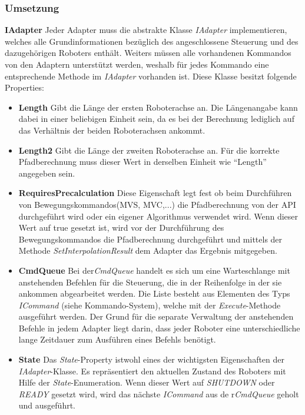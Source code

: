 \subsubsection{Umsetzung}
\textbf{IAdapter}
\newline
Jeder Adapter muss die abstrakte Klasse \textit{IAdapter} implementieren, welches alle Grundinformationen bezüglich des angeschlossene Steuerung und des dazugehörigen Roboters enthält. Weiters müssen alle vorhandenen Kommandos von den Adaptern unterstützt werden, weshalb für jedes Kommando eine entsprechende Methode im \textit{IAdapter} vorhanden ist. Diese Klasse besitzt folgende Properties:
\begin{itemize}
\item \textbf{Length}
\newline
Gibt die Länge der ersten Roboterachse an. Die Längenangabe kann dabei in einer beliebigen Einheit sein, da es bei der Berechnung lediglich auf das Verhältnis der beiden Roboterachsen ankommt.
\item \textbf{Length2}
\newline
Gibt die Länge der zweiten Roboterachse an. Für die korrekte Pfadberechnung muss dieser Wert in derselben Einheit wie “Length” angegeben sein.
\item \textbf{RequiresPrecalculation}
\newline
Diese Eigenschaft legt fest ob beim Durchführen von Bewegungskommandos(MVS, MVC,...) die Pfadberechnung von der API durchgeführt wird oder ein eigener Algorithmus verwendet wird. Wenn dieser Wert auf true gesetzt ist, wird vor der Durchführung des Bewegungskommandos die Pfadberechnung durchgeführt und mittels der Methode \textit{SetInterpolationResult} dem Adapter das Ergebnis mitgegeben.
\item \textbf{CmdQueue}
\newline
Bei der\textit{CmdQueue} handelt es sich um eine Warteschlange mit anstehenden Befehlen für die Steuerung, die in der Reihenfolge in der sie ankommen abgearbeitet werden. Die Liste besteht aus Elementen des Typs \textit{ICommand} (siehe Kommando-System), welche mit der \textit{Execute}-Methode ausgeführt werden.
Der Grund für die separate Verwaltung der anstehenden Befehle in jedem Adapter liegt darin, dass jeder Roboter eine unterschiedliche lange Zeitdauer zum Ausführen eines Befehls benötigt.
\item \textbf{State}
\newline
Das \textit{State}-Property istwohl eines der wichtigsten Eigenschaften der \textit{IAdapter}-Klasse. Es repräsentiert den aktuellen Zustand des Roboters mit Hilfe der \textit{State}-Enumeration. Wenn dieser Wert auf \textit{SHUTDOWN} oder  \textit{READY} gesetzt wird, wird das nächste \textit{ICommand} aus de r\textit{CmdQueue} geholt und ausgeführt.
\end{itemize}

